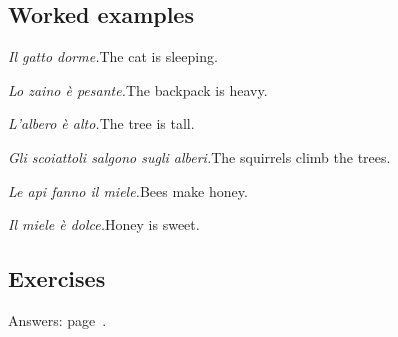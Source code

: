 \documentclass[11pt,a4paper,twoside,openright]{book}
\begin{document}
\subsection*{Worked examples}
\begin{examples}
\item\relax \textit{Il gatto dorme.}\newline The cat is sleeping.
\item\relax \textit{Lo zaino è pesante.}\newline The backpack is heavy.
\item\relax \textit{L'albero è alto.}\newline The tree is tall.
\item\relax \textit{Gli scoiattoli salgono sugli alberi.}\newline The squirrels climb the trees.
\item\relax \textit{Le api fanno il miele.}\newline Bees make honey.
\item\relax \textit{Il miele è dolce.}\newline Honey is sweet.
\end{examples}

\subsection*{Exercises}\label{les:definite-articles:exercises}
{\color{muted}\small Answers: page~\pageref{ans:definite-articles}.}
\end{document}
